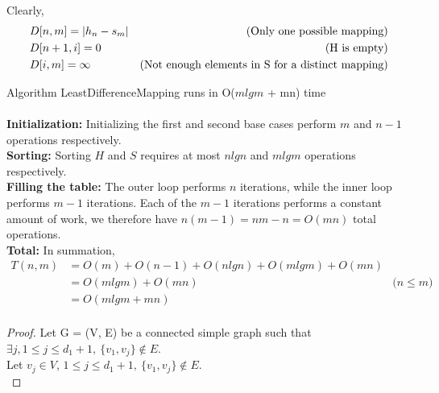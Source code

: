 \documentclass[12pt]{article}
\newenvironment{lemma}[2][Lemma]{\begin{trivlist}
\item[\hskip \labelsep {\bfseries #1}\hskip \labelsep {\bfseries #2.}]}{\end{trivlist}}
\newenvironment{question}[2][Question]{\begin{trivlist}
\item[\hskip \labelsep {\bfseries #1}\hskip \labelsep {\bfseries #2.}]}{\end{trivlist}}
\DeclarePairedDelimiter\abs{\lvert}{\rvert}%
\begin{document}
\begin{question}{2 (b)}
\begin{lemma}{2.1}
    Clearly,
    \begin{align*}
      & D[n, m] = \abs{h_{n} - s_{m}} & \text{(Only one possible mapping)} \\
      & D[n + 1, i] = 0 & \text{(H is empty)} \\
      & D[i, m] = \infty & \text{(Not enough elements in S for a distinct mapping)}
    \end{align*}
  \end{lemma}

  \begin{lemma}{2.2} Algorithm LeastDifferenceMapping runs in O($mlgm$ + mn) time
    \leavevmode \\ \\
    \textbf{Initialization:} Initializing the first and second base cases perform
    $m$ and $n - 1$ operations respectively. \\

    \textbf{Sorting:} Sorting $H$ and $S$ requires at most $nlgn$ and $mlgm$ operations
    respectively. \\

    \textbf{Filling the table:} The outer loop performs $n$ iterations, while the
    inner loop performs $m-1$ iterations.  Each of the $m-1$ iterations performs
    a constant amount of work, we therefore have $n(m-1) = nm - n = O(mn)$ total operations. \\

    \textbf{Total:} In summation,
    \begin{align*}
      T(n, m) & = O(m) + O(n - 1) + O(nlgn) + O(mlgm) + O(mn) & \\
           & = O(mlgm) + O(mn) & \text{($n \leq m$)} \\
           & = O(mlgm + mn) & \\
    \end{align*}
  \end{lemma}
\end{question}

\begin{question}{3 (a)}
  \leavevmode
  \begin{proof}
    Let G = (V, E) be a connected simple graph such that $\exists j, 1 \leq j \leq d_{1} + 1,\ \{v_{1}, v_{j}\} \notin E$. \\
    Let $v_{j} \in V$, $1\leq j \leq d_{1} + 1,\ \{v_{1}, v_{j}\} \notin E$. \\
  \end{proof}
\end{question}
\end{document}
